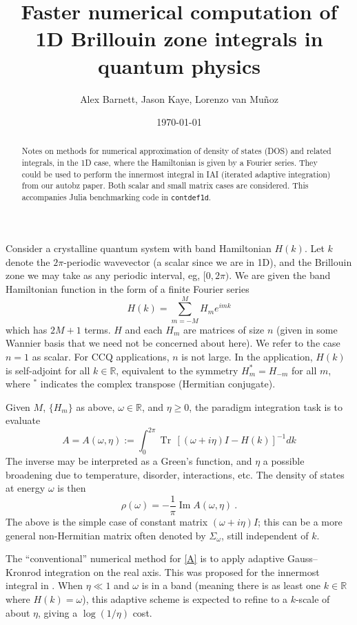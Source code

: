 \documentclass[11pt]{article}
\newcommand{\be}{\begin{equation}}
\newcommand{\ee}{\end{equation}}
\newcommand{\R}{\mathbb{R}}
\DeclareMathOperator{\im}{Im}
\DeclareMathOperator{\tr}{Tr}
\newcommand{\om}{\omega}
\begin{document}
\title{Faster numerical computation of 1D Brillouin zone integrals in quantum physics}
\author{Alex Barnett, Jason Kaye, Lorenzo van Mu\~noz}
\date{\today}
\maketitle
\begin{abstract}
  Notes on methods for numerical approximation of density of states
  (DOS) and related integrals, in the 1D case, where the Hamiltonian
  is given by a Fourier series. They could be used
  to perform the innermost integral in IAI (iterated adaptive integration)
  from our autobz paper.
  Both scalar and small matrix cases are considered.
  This accompanies Julia benchmarking code in \texttt{contdef1d}.
\end{abstract}

Consider a crystalline quantum system with band Hamiltonian $H(k)$.
Let $k$ denote the $2\pi$-periodic wavevector (a scalar since we are in 1D), and
the Brillouin zone we may take as any periodic interval, eg, $[0,2\pi)$.
We are given the band Hamiltonian function in the form of a finite Fourier
series
\be
H(k) = \sum_{m=-M}^M H_m e^{imk}
\label{Hk}
\ee
which has $2M+1$ terms. $H$ and each $H_m$ are matrices of size $n$
(given in some Wannier basis that we need not be concerned about here).
We refer to the case $n=1$ as scalar.
For CCQ applications, $n$ is not large.
In the application, $H(k)$ is self-adjoint for all $k\in\R$,
equivalent to the symmetry $H_m^* = H_{-m}$ for all $m$, where
$^*$ indicates the complex transpose (Hermitian conjugate).

Given $M$, $\{H_m\}$ as above, $\om\in \R$, and $\eta\ge0$,
the paradigm integration task is to evaluate
\be
A = A(\om,\eta) := \int_{0}^{2\pi} \tr\, [(\om +i\eta)I - H(k)]^{-1} dk
\label{A}
\ee
The inverse may be interpreted as a Green's function, and $\eta$
a possible broadening due to temperature, disorder, interactions, etc.
The density of states at energy $\om$ is then
\be
\rho(\om) = -\frac{1}{\pi}\im A(\om,\eta)~.
\label{DOS}
\ee
The above is the simple case of constant matrix $(\om+i\eta)I$; this
can be a more general non-Hermitian matrix often denoted by
$\Sigma_\om$, still independent of $k$.

The ``conventional'' numerical method for \eqref{A} is
to apply adaptive Gauss--Kronrod integration on the real axis.
This was proposed for the innermost integral in \cite{autobz}.
When $\eta\ll1$ and $\om$ is in a band (meaning there is as least one
$k\in\R$ where $H(k)=\om$), this adaptive scheme is expected
to refine to a $k$-scale of about $\eta$, giving a $\log(1/\eta)$ cost.
\end{document}
